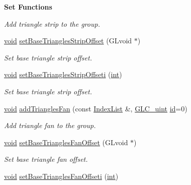 \begin{Indent}{\bf Set Functions}
\begin{DoxyCompactItemize}
\begin{DoxyCompactList}\small\item\em Add triangle strip to the group. \end{DoxyCompactList}\item 
\hyperlink{group___u_a_v_objects_plugin_ga444cf2ff3f0ecbe028adce838d373f5c}{void} \hyperlink{class_g_l_c___primitive_group_ab6a50236598423bcec94b251eb55bd96}{set\-Base\-Triangles\-Strip\-Offset} (G\-Lvoid $\ast$)
\begin{DoxyCompactList}\small\item\em Set base triangle strip offset. \end{DoxyCompactList}\item 
\hyperlink{group___u_a_v_objects_plugin_ga444cf2ff3f0ecbe028adce838d373f5c}{void} \hyperlink{class_g_l_c___primitive_group_acb889f7cb221fde0eec4f05dc2947291}{set\-Base\-Triangles\-Strip\-Offseti} (\hyperlink{ioapi_8h_a787fa3cf048117ba7123753c1e74fcd6}{int})
\begin{DoxyCompactList}\small\item\em Set base triangle strip offset. \end{DoxyCompactList}\item 
\hyperlink{group___u_a_v_objects_plugin_ga444cf2ff3f0ecbe028adce838d373f5c}{void} \hyperlink{class_g_l_c___primitive_group_a6eab3484e24d4a1dd36dded264172711}{add\-Triangles\-Fan} (const \hyperlink{glc__global_8h_a92568854751d0cfbc27eae9c76aab7cf}{Index\-List} \&, \hyperlink{glc__global_8h_abf950976fabed69026558df8e2da6c6b}{G\-L\-C\-\_\-uint} \hyperlink{glext_8h_a58c2a664503e14ffb8f21012aabff3e9}{id}=0)
\begin{DoxyCompactList}\small\item\em Add triangle fan to the group. \end{DoxyCompactList}\item 
\hyperlink{group___u_a_v_objects_plugin_ga444cf2ff3f0ecbe028adce838d373f5c}{void} \hyperlink{class_g_l_c___primitive_group_ac3ec9b81e5de3e985cdcc3dea44032e5}{set\-Base\-Triangles\-Fan\-Offset} (G\-Lvoid $\ast$)
\begin{DoxyCompactList}\small\item\em Set base triangle fan offset. \end{DoxyCompactList}\item 
\hyperlink{group___u_a_v_objects_plugin_ga444cf2ff3f0ecbe028adce838d373f5c}{void} \hyperlink{class_g_l_c___primitive_group_a93140a4ea0e8a3b1789de258e120d08f}{set\-Base\-Triangles\-Fan\-Offseti} (\hyperlink{ioapi_8h_a787fa3cf048117ba7123753c1e74fcd6}{int})

\end{DoxyCompactItemize}
\end{Indent}
